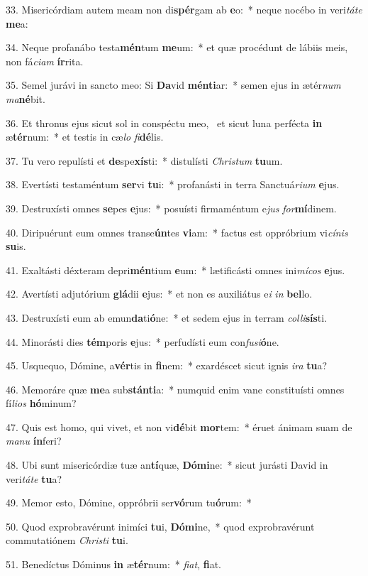 33. Misericórdiam autem meam non di\textbf{spér}gam ab \textbf{e}o:~*  neque nocébo in veri\textit{tá}\textit{te} \textbf{me}a:\

34. Neque profanábo testa\textbf{mén}tum \textbf{me}um:~*  et quæ procédunt de lábiis meis, non fá\textit{ci}\textit{am} \textbf{ír}rita.\

35. Semel jurávi in sancto meo: Si \textbf{Da}vid \textbf{mén}\textbf{ti}ar:~*  semen ejus in ætér\textit{num} \textit{ma}\textbf{né}bit.\

36. Et thronus ejus sicut sol in conspéctu meo, \dag\  et sicut luna perfécta \textbf{in} æ\textbf{tér}num:~*  et testis in cæ\textit{lo} \textit{fi}\textbf{dé}lis.\

37. Tu vero repulísti et \textbf{de}spe\textbf{xís}ti:~*  distulísti \textit{Chris}\textit{tum} \textbf{tu}um.\

38. Evertísti testaméntum \textbf{ser}vi \textbf{tu}i:~*  profanásti in terra Sanctuá\textit{ri}\textit{um} \textbf{e}jus.\

39. Destruxísti omnes \textbf{se}pes \textbf{e}jus:~*  posuísti firmaméntum e\textit{jus} \textit{for}\textbf{mí}dinem.\

40. Diripuérunt eum omnes transe\textbf{ún}tes \textbf{vi}am:~*  factus est oppróbrium vi\textit{cí}\textit{nis} \textbf{su}is.\

41. Exaltásti déxteram depri\textbf{mén}tium \textbf{e}um:~*  lætificásti omnes ini\textit{mí}\textit{cos} \textbf{e}jus.\

42. Avertísti adjutórium \textbf{glá}dii \textbf{e}jus:~*  et non es auxiliátus e\textit{i} \textit{in} \textbf{bel}lo.\

43. Destruxísti eum ab emun\textbf{da}ti\textbf{ó}ne:~*  et sedem ejus in terram \textit{col}\textit{li}\textbf{sís}ti.\

44. Minorásti dies \textbf{tém}poris \textbf{e}jus:~*  perfudísti eum con\textit{fu}\textit{si}\textbf{ó}ne.\

45. Usquequo, Dómine, a\textbf{vér}tis in \textbf{fi}nem:~*  exardéscet sicut ignis \textit{i}\textit{ra} \textbf{tu}a?\

46. Memoráre quæ \textbf{me}a sub\textbf{stán}\textbf{ti}a:~*  numquid enim vane constituísti omnes fí\textit{li}\textit{os} \textbf{hó}minum?\

47. Quis est homo, qui vivet, et non vi\textbf{dé}bit \textbf{mor}tem:~*  éruet ánimam suam de \textit{ma}\textit{nu} \textbf{ín}feri?\

48. Ubi sunt misericórdiæ tuæ an\textbf{tí}quæ, \textbf{Dó}\textbf{mi}ne:~*  sicut jurásti David in veri\textit{tá}\textit{te} \textbf{tu}a?\

49. Memor esto, Dómine, oppróbrii ser\textbf{vó}rum tu\textbf{ó}rum:~*  \

50. Quod exprobravérunt inimíci \textbf{tu}i, \textbf{Dó}\textbf{mi}ne,~*  quod exprobravérunt commutatiónem \textit{Chris}\textit{ti} \textbf{tu}i.\

51. Benedíctus Dóminus \textbf{in} æ\textbf{tér}num:~*  \textit{fi}\textit{at}, \textbf{fi}at.\


